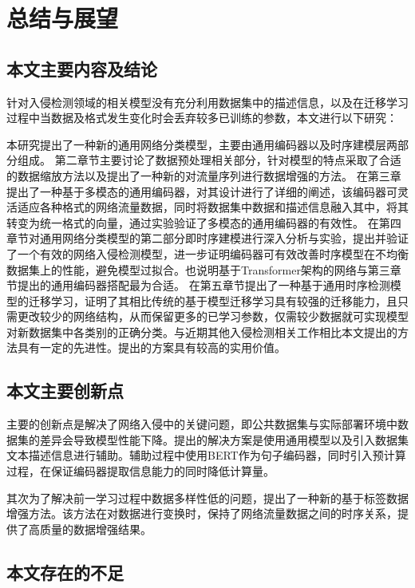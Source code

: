 
\chapter{总结与展望}
\label{cha:conclusion}

\section{本文主要内容及结论}
\label{sec:conclusion}
针对入侵检测领域的相关模型没有充分利用数据集中的描述信息，以及在迁移学习过程中当数据及格式发生变化时会丢弃较多已训练的参数，本文进行以下研究：

本研究提出了一种新的通用网络分类模型，主要由通用编码器以及时序建模层两部分组成。
第二章节主要讨论了数据预处理相关部分，针对模型的特点采取了合适的数据缩放方法以及提出了一种新的对流量序列进行数据增强的方法。
在第三章提出了一种基于多模态的通用编码器，对其设计进行了详细的阐述，该编码器可灵活适应各种格式的网络流量数据，同时将数据集中数据和描述信息融入其中，将其转变为统一格式的向量，通过实验验证了多模态的通用编码器的有效性。
在第四章节对通用网络分类模型的第二部分即时序建模进行深入分析与实验，提出并验证了一个有效的网络入侵检测模型，进一步证明编码器可有效改善时序模型在不均衡数据集上的性能，避免模型过拟合。也说明基于Transformer架构的网络与第三章节提出的通用编码器搭配最为合适。
在第五章节提出了一种基于通用时序检测模型的迁移学习，证明了其相比传统的基于模型迁移学习具有较强的迁移能力，且只需更改较少的网络结构，从而保留更多的已学习参数，仅需较少数据就可实现模型对新数据集中各类别的正确分类。与近期其他入侵检测相关工作相比本文提出的方法具有一定的先进性。提出的方案具有较高的实用价值。

\section{本文主要创新点}
\label{sec:contribution}
主要的创新点是解决了网络入侵中的关键问题，即公共数据集与实际部署环境中数据集的差异会导致模型性能下降。提出的解决方案是使用通用模型以及引入数据集文本描述信息进行辅助。辅助过程中使用BERT作为句子编码器，同时引入预计算过程，在保证编码器提取信息能力的同时降低计算量。

其次为了解决前一学习过程中数据多样性低的问题，提出了一种新的基于标签数据增强方法。该方法在对数据进行变换时，保持了网络流量数据之间的时序关系，提供了高质量的数据增强结果。

\section{本文存在的不足}

